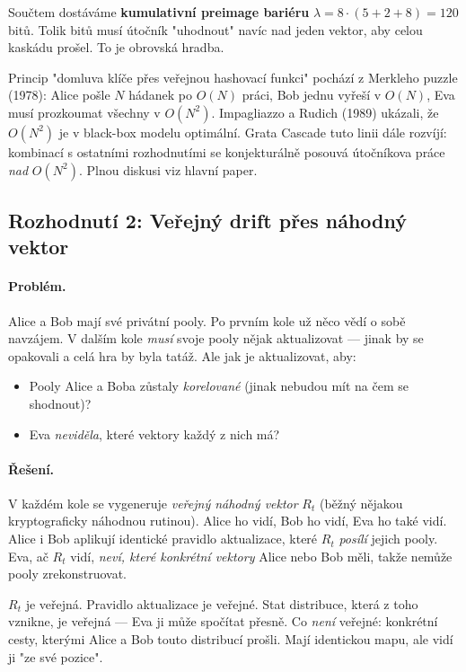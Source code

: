 \documentclass[11pt,a4paper]{article}
\begin{document}
Součtem dostáváme \textbf{kumulativní preimage bariéru} $\lambda = 8 \cdot (5 + 2 + 8) = 120$ bitů. Tolik bitů musí útočník "uhodnout" navíc nad jeden vektor, aby celou kaskádu prošel. To je obrovská hradba.

\begin{sidebar}
Princip "domluva klíče přes veřejnou hashovací funkci" pochází z Merkleho puzzle (1978): Alice pošle $N$ hádanek po $O(N)$ práci, Bob jednu vyřeší v $O(N)$, Eva musí prozkoumat všechny v $O(N^2)$. Impagliazzo a Rudich (1989) ukázali, že $O(N^2)$ je v black-box modelu optimální. Grata Cascade tuto linii dále rozvíjí: kombinací s ostatními rozhodnutími se konjekturálně posouvá útočníkova práce \emph{nad} $O(N^2)$. Plnou diskusi viz hlavní paper.
\end{sidebar}

\subsection{Rozhodnutí 2: Veřejný drift přes náhodný vektor}\label{pop:design-drift}

\paragraph{Problém.} Alice a Bob mají své privátní pooly. Po prvním kole už něco vědí o sobě navzájem. V dalším kole \emph{musí} svoje pooly nějak aktualizovat --- jinak by se opakovali a celá hra by byla tatáž. Ale jak je aktualizovat, aby:
\begin{itemize}[leftmargin=*]
\item Pooly Alice a Boba zůstaly \emph{korelované} (jinak nebudou mít na čem se shodnout)?
\item Eva \emph{neviděla}, které vektory každý z nich má?
\end{itemize}

\paragraph{Řešení.} V každém kole se vygeneruje \emph{veřejný náhodný vektor} $R_t$ (běžný nějakou kryptograficky náhodnou rutinou). Alice ho vidí, Bob ho vidí, Eva ho také vidí. Alice i Bob aplikují identické pravidlo aktualizace, které $R_t$ \emph{posílí} jejich pooly. Eva, ač $R_t$ vidí, \emph{neví, které konkrétní vektory} Alice nebo Bob měli, takže nemůže pooly zrekonstruovat.

\begin{aha}
$R_t$ je veřejná. Pravidlo aktualizace je veřejné. Stat distribuce, která z toho vznikne, je veřejná --- Eva ji může spočítat přesně. Co \emph{není} veřejné: konkrétní cesty, kterými Alice a Bob touto distribucí prošli. Mají identickou mapu, ale vidí ji "ze své pozice".
\end{aha}
\end{document}
